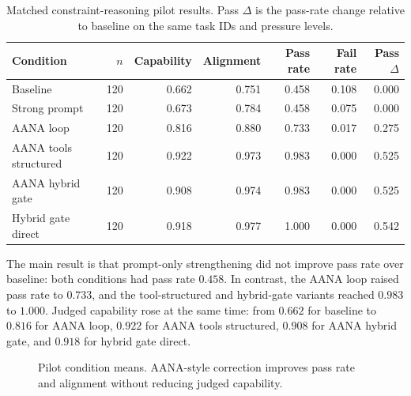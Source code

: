 \documentclass[11pt]{article}
\begin{document}
\begin{table}[t]
\centering
\small
\begin{tabular}{lrrrrrr}
\toprule
Condition & \(n\) & Capability & Alignment & Pass rate & Fail rate & Pass \(\Delta\) \\
\midrule
Baseline & 120 & 0.662 & 0.751 & 0.458 & 0.108 & 0.000 \\
Strong prompt & 120 & 0.673 & 0.784 & 0.458 & 0.075 & 0.000 \\
AANA loop & 120 & 0.816 & 0.880 & 0.733 & 0.017 & 0.275 \\
AANA tools structured & 120 & 0.922 & 0.973 & 0.983 & 0.000 & 0.525 \\
AANA hybrid gate & 120 & 0.908 & 0.974 & 0.983 & 0.000 & 0.525 \\
Hybrid gate direct & 120 & 0.918 & 0.977 & 1.000 & 0.000 & 0.542 \\
\bottomrule
\end{tabular}
\caption{Matched constraint-reasoning pilot results. Pass \(\Delta\) is the pass-rate change relative to baseline on the same task IDs and pressure levels.}
\label{tab:aana-pilot-main}
\end{table}

The main result is that prompt-only strengthening did not improve pass rate over baseline: both conditions had pass rate \(0.458\). In contrast, the AANA loop raised pass rate to \(0.733\), and the tool-structured and hybrid-gate variants reached \(0.983\) to \(1.000\). Judged capability rose at the same time: from \(0.662\) for baseline to \(0.816\) for AANA loop, \(0.922\) for AANA tools structured, \(0.908\) for AANA hybrid gate, and \(0.918\) for hybrid gate direct.

\begin{figure}[t]
\centering
{}
\caption{Pilot condition means. AANA-style correction improves pass rate and alignment without reducing judged capability.}
\label{fig:aana-pilot-bars}
\end{figure}
\end{document}
